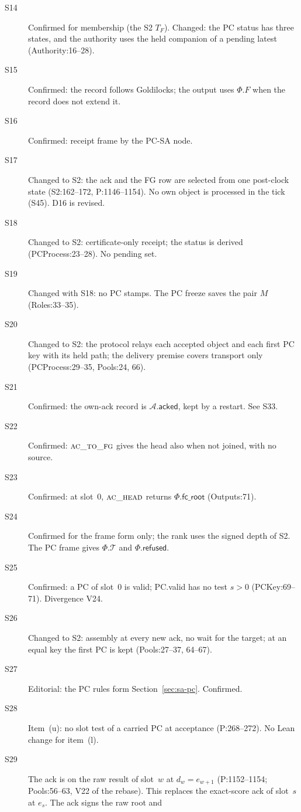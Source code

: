 \documentclass{article}
\newcommand{\T}{\mathcal T}
\newcommand{\AC}{\mathcal A}
\newcommand{\Fr}{\Phi}
\newcommand{\fcroot}{\mathsf{fc\_root}}
\newcommand{\acked}{\mathsf{acked}}
\begin{document}
\begin{description}
\item[S14] Confirmed for membership (the S2 $T_F$).  Changed: the PC
  status has three states, and the authority uses the held companion of
  a pending latest (Authority:16--28).
\item[S15] Confirmed: the record follows Goldilocks; the output uses
  $\Fr.F$ when the record does not extend it.
\item[S16] Confirmed: receipt frame by the PC-SA node.
\item[S17] Changed to S2: the ack and the FG row are selected from one
  post-clock state (S2:162--172, P:1146--1154).  No own object is
  processed in the tick (S45).  D16 is revised.
\item[S18] Changed to S2: certificate-only receipt; the status is derived
  (PCProcess:23--28).  No pending set.
\item[S19] Changed with S18: no PC stamps.  The PC freeze saves the pair
  $M$ (Roles:33--35).
\item[S20] Changed to S2: the protocol relays each accepted object and
  each first PC key with its held path; the delivery premise covers
  transport only (PCProcess:29--35, Pools:24, 66).
\item[S21] Confirmed: the own-ack record is $\AC.\acked$, kept by a
  restart.  See S33.
\item[S22] Confirmed: $\Call{ac\_to\_fg}{}$ gives the head also when not
  joined, with no source.
\item[S23] Confirmed: at slot~0, $\Call{ac\_head}{}$ returns
  $\Fr.\fcroot$ (Outputs:71).
\item[S24] Confirmed for the frame form only; the rank uses the signed
  depth of S2.  The PC frame gives $\Fr.\T$ and $\Fr.\mathsf{refused}$.
\item[S25] Confirmed: a PC of slot~0 is valid; PC.valid has no test $s>0$
  (PCKey:69--71).  Divergence V24.
\item[S26] Changed to S2: assembly at every new ack, no wait for the
  target; at an equal key the first PC is kept (Pools:27--37, 64--67).
\item[S27] Editorial: the PC rules form Section~\ref{sec:sa-pc}.  Confirmed.
\item[S28] Item~(u): no slot test of a carried PC at acceptance
  (P:268--272).  No Lean change for item~(l).
\item[S29] The ack is on the raw result of slot~$w$ at $d_w=e_{w+1}$
  (P:1152--1154; Pools:56--63, V22 of the rebase).  This replaces the
  exact-score ack of slot~$s$ at $e_s$.  The ack signs the raw root and

\end{description}
\end{document}
